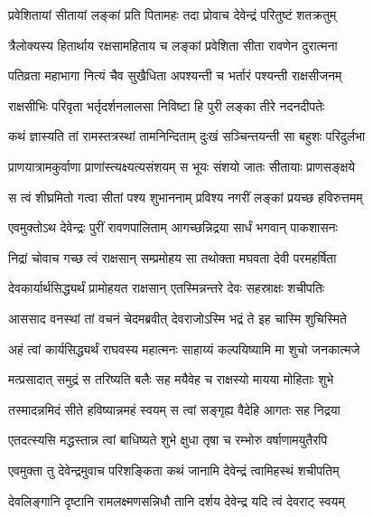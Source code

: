 
\twolineshloka
{प्रवेशितायां सीतायां लङ्कां प्रति पितामहः}
{तदा प्रोवाच देवेन्द्रं परितुष्टं शतक्रतुम्} %

\twolineshloka
{त्रैलोक्यस्य हितार्थाय रक्षसामहिताय च}
{लङ्कां प्रवेशिता सीता रावणेन दुरात्मना} %

\twolineshloka
{पतिव्रता महाभागा नित्यं चैव सुखैधिता}
{अपश्यन्ती च भर्तारं पश्यन्ती राक्षसीजनम्} %

\twolineshloka
{राक्षसीभिः परिवृता भर्तृदर्शनलालसा}
{निविष्टा हि पुरी लङ्का तीरे नदनदीपतेः} %

\twolineshloka
{कथं ज्ञास्यति तां रामस्तत्रस्थां तामनिन्दिताम्}
{दुःखं सञ्चिन्तयन्ती सा बहुशः परिदुर्लभा} %

\twolineshloka
{प्राणयात्रामकुर्वाणा प्राणांस्त्यक्ष्यत्यसंशयम्}
{स भूयः संशयो जातः सीतायाः प्राणसङ्क्षये} %

\twolineshloka
{स त्वं शीघ्रमितो गत्वा सीतां पश्य शुभाननाम्}
{प्रविश्य नगरीं लङ्कां प्रयच्छ हविरुत्तमम्} %

\twolineshloka
{एवमुक्तोऽथ देवेन्द्रः पुरीं रावणपालिताम्}
{आगच्छन्निद्रया सार्धं भगवान् पाकशासनः} %

\twolineshloka
{निद्रां चोवाच गच्छ त्वं राक्षसान् सम्प्रमोहय}
{सा तथोक्ता मघवता देवी परमहर्षिता} %

\twolineshloka
{देवकार्यार्थसिद्ध्यर्थं प्रामोहयत राक्षसान्}
{एतस्मिन्नन्तरे देवः सहस्राक्षः शचीपतिः} %

\twolineshloka
{आससाद वनस्थां तां वचनं चेदमब्रवीत्}
{देवराजोऽस्मि भद्रं ते इह चास्मि शुचिस्मिते} %

\twolineshloka
{अहं त्वां कार्यसिद्ध्यर्थं राघवस्य महात्मनः}
{साहाय्यं कल्पयिष्यामि मा शुचो जनकात्मजे} %

\twolineshloka
{मत्प्रसादात् समुद्रं स तरिष्यति बलैः सह}
{मयैवेह च राक्षस्यो मायया मोहिताः शुभे} %

\twolineshloka
{तस्मादन्नमिदं सीते हविष्यान्नमहं स्वयम्}
{स त्वां सङ्गृह्य वैदेहि आगतः सह निद्रया} %

\twolineshloka
{एतदत्स्यसि मद्धस्तान्न त्वां बाधिष्यते शुभे}
{क्षुधा तृषा च रम्भोरु वर्षाणामयुतैरपि} %

\twolineshloka
{एवमुक्ता तु देवेन्द्रमुवाच परिशङ्किता}
{कथं जानामि देवेन्द्रं त्वामिहस्थं शचीपतिम्} %

\twolineshloka
{देवलिङ्गानि दृष्टानि रामलक्ष्मणसन्निधौ}
{तानि दर्शय देवेन्द्र यदि त्वं देवराट् स्वयम्} %


